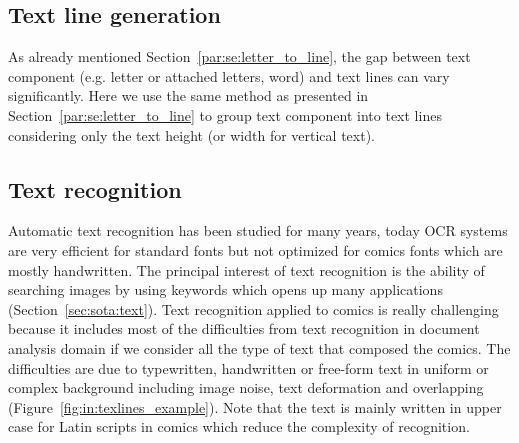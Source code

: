 

\subsection{Text line generation} %
\label{sub:in:text_line_generation}
As already mentioned Section~\ref{par:se:letter_to_line}, the gap between text component (e.g. letter or attached letters, word) and text lines can vary significantly.
Here we use the same method as presented in Section~\ref{par:se:letter_to_line} to group text component into text lines considering only the text height (or width for vertical text).



\subsection{Text recognition} %
\label{sub:in:text_recognition}
Automatic text recognition has been studied for many years, today OCR systems are very efficient for standard fonts but not optimized for comics fonts which are mostly handwritten.
The principal interest of text recognition is the ability of searching images by using keywords which opens up many applications (Section~\ref{sec:sota:text}).
Text recognition applied to comics is really challenging because it includes most of the difficulties from text recognition in document analysis domain if we consider all the type of text that composed the comics.
The difficulties are due to typewritten, handwritten or free-form text in uniform or complex background including image noise, text deformation and overlapping (Figure~\ref{fig:in:texlines_example}).
Note that the text is mainly written in upper case for Latin scripts in comics which reduce the complexity of recognition.

